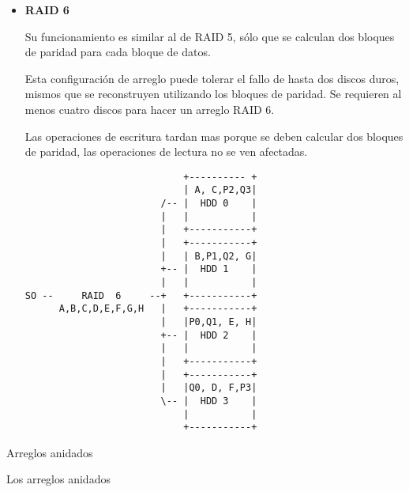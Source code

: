 \begin{itemize}
  \item \textbf{RAID 6}

Su funcionamiento es similar al de RAID 5, s\'{o}lo que se calculan dos bloques de paridad para cada bloque de datos.

Esta configuraci\'{o}n de arreglo puede tolerar el fallo de hasta dos discos duros, mismos que se reconstruyen utilizando los bloques de paridad. Se requieren al menos cuatro discos para hacer un arreglo RAID 6.

Las operaciones de escritura tardan mas porque se deben calcular dos bloques de paridad, las operaciones de lectura no se ven afectadas.
  
{
\scriptsize
\linespread{1}
\begin{verbatim}
                            +---------- +
                            | A, C,P2,Q3|
                        /-- |  HDD 0    |
                        |   |           |
                        |   +-----------+
                        |   +-----------+
                        |   | B,P1,Q2, G|
                        +-- |  HDD 1    |
                        |   |           |
SO --     RAID  6     --+   +-----------+
      A,B,C,D,E,F,G,H   |   +-----------+
                        |   |P0,Q1, E, H|
                        +-- |  HDD 2    |
                        |   |           |
                        |   +-----------+
                        |   +-----------+
                        |   |Q0, D, F,P3|
                        \-- |  HDD 3    |
                            |           |
                            +-----------+
\end{verbatim}
}
 
\end{itemize}

Arreglos anidados

Los arreglos anidados \cite{3e1f0dad689a7971f226a3ded845ae63}

